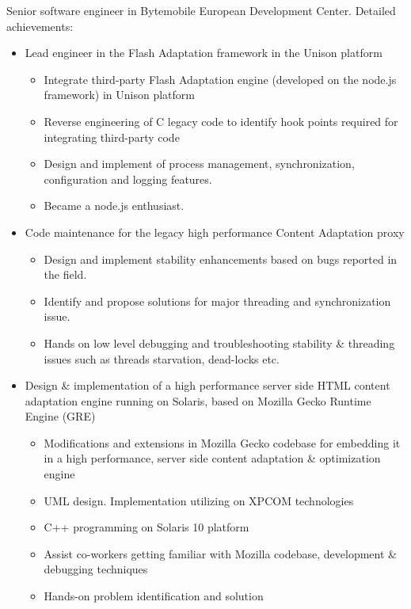 \documentclass[10pt,a4paper]{moderncv}        %
\begin{document}
{Senior software engineer in Bytemobile European Development Center.\newline{}%
Detailed achievements:%
\begin{itemize}%
  \item Lead engineer in the Flash Adaptation framework in the Unison platform
  \begin{itemize}%
    \item	Integrate third-party Flash Adaptation engine 
    (developed on the node.js framework) in Unison platform
    \item	Reverse engineering of C legacy code to identify hook points required for integrating third-party code
    \item	Design and implement of process management, synchronization, configuration and logging features.
    \item	Became a node.js enthusiast.
  \end{itemize}
  \item Code maintenance for the legacy high performance Content Adaptation proxy
  \begin{itemize}%
    \item Design and implement stability enhancements based on bugs reported in the field.
    \item Identify and propose solutions for major threading and synchronization issue.
    \item Hands on low level debugging and troubleshooting stability \& threading issues 
    such as threads starvation, dead-locks etc.
  \end{itemize}
  \item Design \& implementation 
  of a high performance server side HTML content adaptation engine 
  running on Solaris, based on Mozilla Gecko Runtime Engine (GRE)
  \begin{itemize}%
    \item Modifications and extensions in Mozilla Gecko codebase 
    for embedding it in a high performance, server side content adaptation \& optimization engine
    \item UML design. Implementation utilizing on XPCOM technologies
    \item C++ programming on Solaris 10 platform
    \item Assist co-workers getting familiar with Mozilla codebase, development \& debugging techniques
    \item Hands-on problem identification and solution
  \end{itemize}
\end{itemize}}
\end{document}
